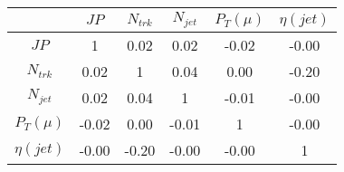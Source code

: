 \begin{tabular}{|c|c|c|c|c|c|} 
\hline
 & $JP$ & $N_{trk}$ & $N_{jet}$ & $P_{T} (\mu)$ & $\eta (jet)$ \\ \hline
$JP$ & 1 & 0.02 & 0.02 & -0.02 & -0.00 \\
$N_{trk}$ & 0.02 & 1 & 0.04 & 0.00 & -0.20 \\
$N_{jet}$ & 0.02 & 0.04 & 1 & -0.01 & -0.00 \\
$P_{T} (\mu)$ & -0.02 & 0.00 & -0.01 & 1 & -0.00 \\
$\eta (jet)$ & -0.00 & -0.20 & -0.00 & -0.00 & 1 \\
\hline 
\end{tabular} 



